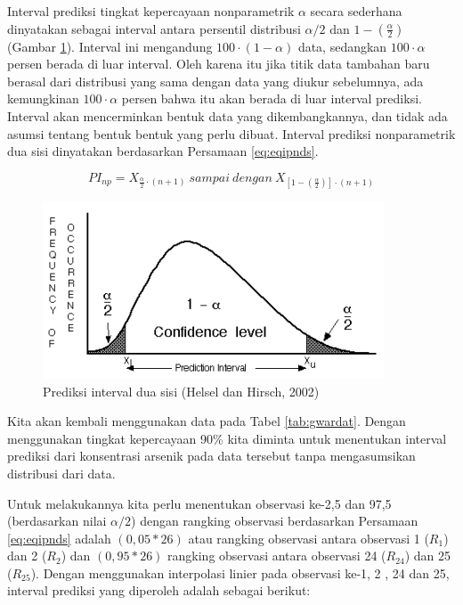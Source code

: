 \documentclass[]{book}
\begin{document}
Interval prediksi tingkat kepercayaan nonparametrik \(\alpha\) secara
sederhana dinyatakan sebagai interval antara persentil distribusi
\(\alpha/2\) dan \(1-\left(\frac{\alpha}{2}\right)\) (Gambar
\ref{fig:ipnds}). Interval ini mengandung
\(100\cdot\left(1-\alpha\right)\) data, sedangkan \(100\cdot\alpha\)
persen berada di luar interval. Oleh karena itu jika titik data tambahan
baru berasal dari distribusi yang sama dengan data yang diukur
sebelumnya, ada kemungkinan \(100\cdot\alpha\) persen bahwa itu akan
berada di luar interval prediksi. Interval akan mencerminkan bentuk data
yang dikembangkannya, dan tidak ada asumsi tentang bentuk bentuk yang
perlu dibuat. Interval prediksi nonparametrik dua sisi dinyatakan
berdasarkan Persamaan \eqref{eq:eqipnds}.

\begin{equation}
  PI_{np}=X_{\frac{\alpha}{2}\cdot\left(n+1\right)}\ sampai\ dengan\ X_{\left[1-\left(\frac{\alpha}{2}\right)\right]\cdot\left(n+1\right)}
  \label{eq:eqipnds}
\end{equation}

\begin{figure}

{\centering \includegraphics[width=0.65\linewidth]{ipnds} 

}

\caption{Prediksi interval dua sisi (Helsel dan Hirsch, 2002)}\label{fig:ipnds}
\end{figure}

Kita akan kembali menggunakan data pada Tabel \ref{tab:gwardat}. Dengan
menggunakan tingkat kepercayaan 90\% kita diminta untuk menentukan
interval prediksi dari konsentrasi arsenik pada data tersebut tanpa
mengasumsikan distribusi dari data.

Untuk melakukannya kita perlu menentukan observasi ke-2,5 dan 97,5
(berdasarkan nilai \(\alpha/2\)) dengan rangking observasi berdasarkan
Persamaan \eqref{eq:eqipnds} adalah \((0,05*26)\) atau rangking observasi
antara observasi 1 (\(R_1\)) dan 2 (\(R_2\)) dan \((0,95*26)\) rangking
observasi antara observasi 24 (\(R_{24}\)) dan 25 (\(R_{25}\)). Dengan
menggunakan interpolasi linier pada observasi ke-1, 2 , 24 dan 25,
interval prediksi yang diperoleh adalah sebagai berikut:
\end{document}
